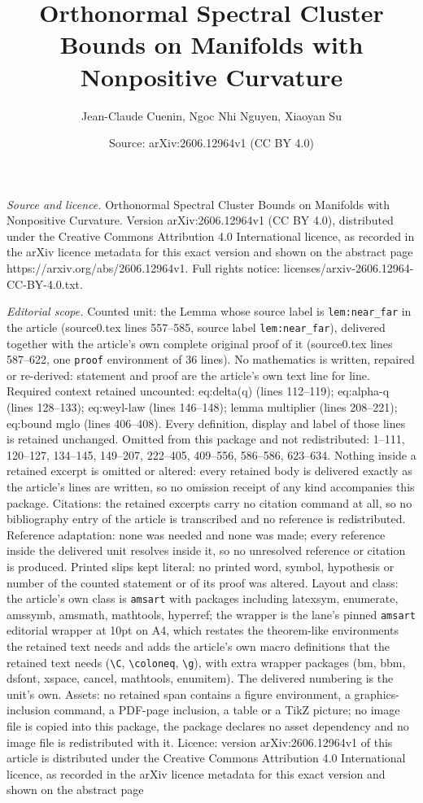 \documentclass[10pt,a4paper]{amsart}
\title[Orthonormal Spectral Cluster Bounds on Manifolds with Nonpos]{Orthonormal Spectral Cluster Bounds on Manifolds with Nonpositive Curvature}
\author{Jean-Claude Cuenin, Ngoc Nhi Nguyen, Xiaoyan Su}
\date{Source: arXiv:2606.12964v1 (CC BY 4.0)}
\begin{document}
\maketitle

\noindent\emph{Source and licence.} Orthonormal Spectral Cluster Bounds on Manifolds with Nonpositive Curvature. Version arXiv:2606.12964v1 (CC BY 4.0), distributed under the Creative Commons Attribution 4.0 International licence, as recorded in the arXiv licence metadata for this exact version and shown on the abstract page https://arxiv.org/abs/2606.12964v1. Full rights notice: licenses/arxiv-2606.12964-CC-BY-4.0.txt.\par\smallskip

\noindent\textit{Editorial scope.} Counted unit: the Lemma whose source label is \texttt{lem:near\_far} in the article (source0.tex lines 557--585, source label \texttt{lem:near\_far}), delivered together with the article's own complete original proof of it (source0.tex lines 587--622, one \texttt{proof} environment of 36 lines). No mathematics is written, repaired or re-derived: statement and proof are the article's own text line for line. Required context retained uncounted: eq:delta(q) (lines 112--119); eq:alpha-q (lines 128--133); eq:weyl-law (lines 146--148); lemma multiplier (lines 208--221); eq:bound mglo (lines 406--408). Every definition, display and label of those lines is retained unchanged. Omitted from this package and not redistributed: 1--111, 120--127, 134--145, 149--207, 222--405, 409--556, 586--586, 623--634. Nothing inside a retained excerpt is omitted or altered: every retained body is delivered exactly as the article's lines are written, so no omission receipt of any kind accompanies this package. Citations: the retained excerpts carry no citation command at all, so no bibliography entry of the article is transcribed and no reference is redistributed. Reference adaptation: none was needed and none was made; every reference inside the delivered unit resolves inside it, so no unresolved reference or citation is produced. Printed slips kept literal: no printed word, symbol, hypothesis or number of the counted statement or of its proof was altered. Layout and class: the article's own class is \texttt{amsart} with packages including latexsym, enumerate, amssymb, amsmath, mathtools, hyperref; the wrapper is the lane's pinned \texttt{amsart} editorial wrapper at 10pt on A4, which restates the theorem-like environments the retained text needs and adds the article's own macro definitions that the retained text needs (\texttt{\textbackslash C}, \texttt{\textbackslash coloneq}, \texttt{\textbackslash g}), with extra wrapper packages (bm, bbm, dsfont, xspace, cancel, mathtools, enumitem). The delivered numbering is the unit's own. Assets: no retained span contains a figure environment, a graphics-inclusion command, a PDF-page inclusion, a table or a TikZ picture; no image file is copied into this package, the package declares no asset dependency and no image file is redistributed with it. Licence: version arXiv:2606.12964v1 of this article is distributed under the Creative Commons Attribution 4.0 International licence, as recorded in the arXiv licence metadata for this exact version and shown on the abstract page 
\end{document}
